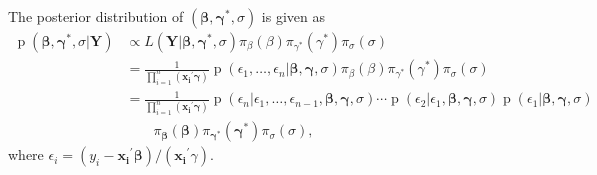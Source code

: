 \documentclass[12pt]{article}
\DeclareMathOperator{\pr}{p}
\begin{document}
The posterior distribution of $(\bm{\beta}, \bm{\gamma^{*}}, \sigma)$ is given as
\begin{equation}\label{ch2:eq:post}
  \begin{aligned}
    \pr(\bm{\beta}, \bm{\gamma^{*}}, \sigma|\bm{Y}) & \propto L(\bm{Y}| \bm{\beta}, \bm{\gamma^{*}}, \sigma)
\pi_{\beta}(\beta) \pi_{\gamma^{*}}(\gamma^{*}) \pi_{\sigma}(\sigma) \\
    & = \frac{1}{\prod_{i=1}^n (\bm{x_i}^{\prime}\bm \gamma)} \pr \left(\epsilon_1, \ldots, \epsilon_n | \bm{\beta}, \bm{\gamma}, \sigma\right)
 \pi_{\beta}(\beta) \pi_{\gamma^{*}}(\gamma^{*}) \pi_{\sigma}(\sigma) \\
    & = \frac{1}{\prod_{i=1}^n (\bm{x_i}^{\prime}\bm\gamma)} \pr \left(\epsilon_n| \epsilon_1, \ldots, \epsilon_{n-1}, \bm{\beta}, \bm{\gamma}, \sigma\right) \cdots \pr \left(\epsilon_2| \epsilon_1, \bm{\beta}, \bm{\gamma}, \sigma\right)
\pr \left(\epsilon_1| \bm{\beta}, \bm{\gamma}, \sigma\right)\\
    & \qquad \pi_{\bm{\beta}}(\bm{\beta}) \pi_{\bm{\gamma}^{*}}(\bm{\gamma}^{*}) \pi_{\sigma}(\sigma),
  \end{aligned}
\end{equation}
where $\epsilon_i = (y_i - \bm{x_i}^{\prime}\bm \beta)/(\bm{x_i}^{\prime}\gamma)$.
\end{document}
